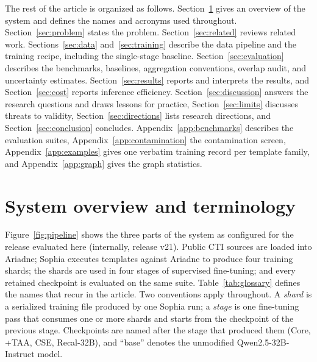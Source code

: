\documentclass[twocolumn]{svjour3}
\begin{document}
The rest of the article is organized as follows. Section~\ref{sec:overview} gives an overview of the system and defines the names and acronyms used throughout. Section~\ref{sec:problem} states the problem. Section~\ref{sec:related} reviews related work. Sections~\ref{sec:data} and~\ref{sec:training} describe the data pipeline and the training recipe, including the single-stage baseline. Section~\ref{sec:evaluation} describes the benchmarks, baselines, aggregation conventions, overlap audit, and uncertainty estimates. Section~\ref{sec:results} reports and interprets the results, and Section~\ref{sec:cost} reports inference efficiency. Section~\ref{sec:discussion} answers the research questions and draws lessons for practice, Section~\ref{sec:limits} discusses threats to validity, Section~\ref{sec:directions} lists research directions, and Section~\ref{sec:conclusion} concludes. Appendix~\ref{app:benchmarks} describes the evaluation suites, Appendix~\ref{app:contamination} the contamination screen, Appendix~\ref{app:examples} gives one verbatim training record per template family, and Appendix~\ref{app:graph} gives the graph statistics.

\section{System overview and terminology}\label{sec:overview}
Figure~\ref{fig:pipeline} shows the three parts of the system as configured for the release evaluated here (internally, release v21). Public CTI sources are loaded into Ariadne; Sophia executes templates against Ariadne to produce four training shards; the shards are used in four stages of supervised fine-tuning; and every retained checkpoint is evaluated on the same suite. Table~\ref{tab:glossary} defines the names that recur in the article. Two conventions apply throughout. A \emph{shard} is a serialized training file produced by one Sophia run; a \emph{stage} is one fine-tuning pass that consumes one or more shards and starts from the checkpoint of the previous stage. Checkpoints are named after the stage that produced them (Core, +TAA, CSE, Recal-32B), and ``base'' denotes the unmodified Qwen2.5-32B-Instruct model.
\end{document}
